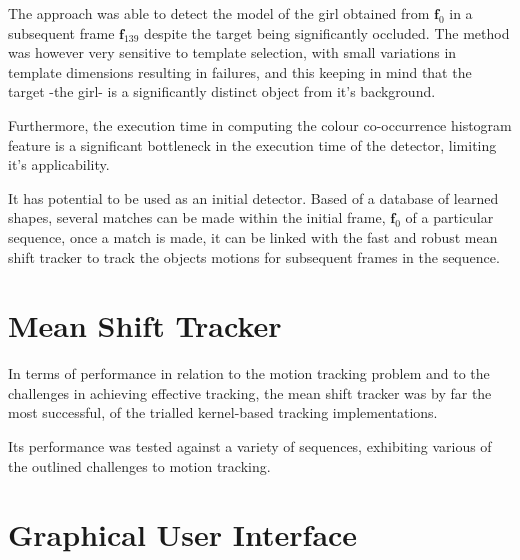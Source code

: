 The approach was able to detect the model of the girl obtained from
$\mathbf{f}_0$ in a subsequent frame $\mathbf{f}_{139}$ despite the target being
significantly occluded. 
The method was however very sensitive to template selection, with small
variations in template dimensions resulting in failures, and this keeping in
mind that the target -the girl- is a significantly distinct object from it's
background. 

Furthermore, the execution time in computing the colour co-occurrence histogram
feature is a significant bottleneck in the execution time of the detector,
limiting it's applicability. 

It has potential to be used as an initial detector. Based of a database of
learned shapes, several matches can be made within the initial frame,
$\mathbf{f}_0$ of a particular sequence, once a match is made, it can be linked
with the fast and robust mean shift tracker to track the objects motions for
subsequent frames in the sequence. 

\section{Mean Shift Tracker}
In terms of performance in relation to the motion tracking problem and to the
challenges in achieving effective tracking, the mean shift tracker was by far
the most successful, of the trialled kernel-based tracking implementations.

Its performance was tested against a variety of sequences, exhibiting various
of the outlined challenges to motion tracking.

\section{Graphical User Interface}



